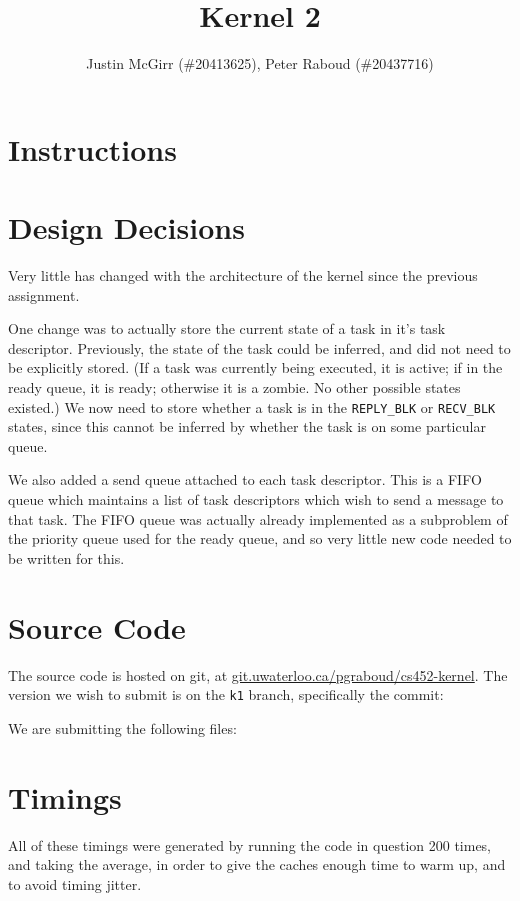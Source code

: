 \documentclass[titlepage]{article}
\begin{document}
\title{Kernel 2}
\author{Justin McGirr (\#20413625), Peter Raboud (\#20437716)}
\maketitle

\section{Instructions}


\section{Design Decisions}
Very little has changed with the architecture of the kernel since the previous assignment.

One change was to actually store the current state of a task in it's task descriptor.
Previously, the state of the task could be inferred, and did not need to be explicitly stored.
(If a task was currently being executed, it is active; if in the ready queue, it is ready; otherwise
it is a zombie. No other possible states existed.)
We now need to store whether a task is in the \texttt{REPLY\_BLK} or \texttt{RECV\_BLK} states,
since this cannot be inferred by whether the task is on some particular queue.

We also added a send queue attached to each task descriptor.
This is a FIFO queue which maintains a list of task descriptors which wish to send a message
to that task.
The FIFO queue was actually already implemented as a subproblem of the priority queue used
for the ready queue, and so very little new code needed to be written for this.

\section{Source Code}
The source code is hosted on git, at \url{git.uwaterloo.ca/pgraboud/cs452-kernel}.
The version we wish to submit is on the \texttt{k1} branch, specifically
the commit:

We are submitting the following files:



\section{Timings}
All of these timings were generated by running the code in question 200 times,
and taking the average, in order to give the caches enough time to warm up, and
to avoid timing jitter.
\end{document}
